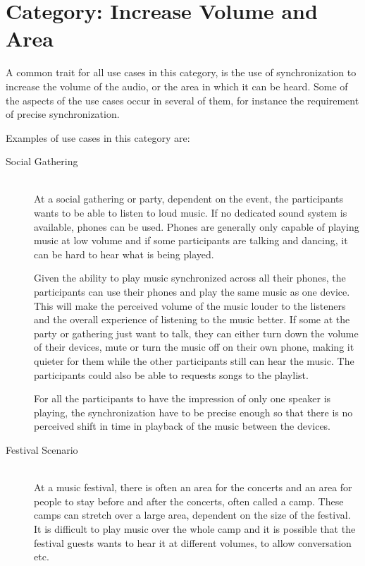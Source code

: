 \section{Category: Increase Volume and Area}\label{sec:category_increase_volume_and_area}
A common trait for all use cases in this category, is the use of synchronization to increase the volume of the audio, or the area in which it can be heard.
Some of the aspects of the use cases occur in several of them, for instance the requirement of precise synchronization.

Examples of use cases in this category are:
\begin{description}
    \item[Social Gathering] \hfill\\
        At a social gathering or party, dependent on the event, the participants wants to be able to listen to loud music.
        If no dedicated sound system is available, phones can be used.
        Phones are generally only capable of playing music at low volume and if some participants are talking and dancing, it can be hard to hear what is being played.

        Given the ability to play music synchronized across all their phones, the participants can use their phones and play the same music as one device.
        This will make the perceived volume of the music louder to the listeners and the overall experience of listening to the music better.
        If some at the party or gathering just want to talk, they can either turn down the volume of their devices, mute or turn the music off on their own phone,
        making it quieter for them while the other participants still can hear the music.
        The participants could also be able to requests songs to the playlist.

        For all the participants to have the impression of only one speaker is playing,
        the synchronization have to be precise enough so that there is no perceived shift in time in playback of the music between the devices.

    \item[Festival Scenario] \hfill\\
        At a music festival, there is often an area for the concerts and an area for people to stay before and after the concerts, often called a camp.
        These camps can stretch over a large area, dependent on the size of the festival.
        It is difficult to play music over the whole camp and it is possible that the festival guests wants to hear it at different volumes, to allow conversation etc.


\end{description}
